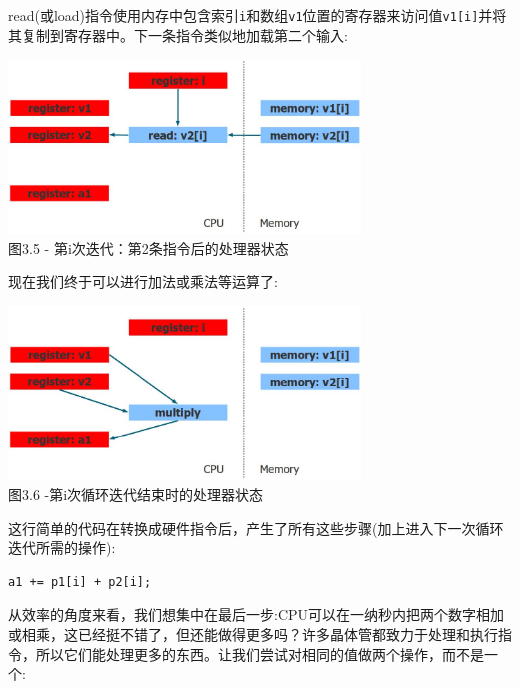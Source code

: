 read(或load)指令使用内存中包含索引\texttt{i}和数组\texttt{v1}位置的寄存器来访问值\texttt{v1[i]}并将其复制到寄存器中。下一条指令类似地加载第二个输入:

\begin{center}
\includegraphics[width=0.7\textwidth]{content/1/chapter3/images/5.jpg}\\
图3.5 - 第i次迭代：第2条指令后的处理器状态
\end{center}

现在我们终于可以进行加法或乘法等运算了:

\begin{center}
\includegraphics[width=0.7\textwidth]{content/1/chapter3/images/6.jpg}\\
图3.6 -第i次循环迭代结束时的处理器状态
\end{center}

这行简单的代码在转换成硬件指令后，产生了所有这些步骤(加上进入下一次循环迭代所需的操作):

\begin{lstlisting}[style=styleCXX]
a1 += p1[i] + p2[i];
\end{lstlisting}

从效率的角度来看，我们想集中在最后一步:CPU可以在一纳秒内把两个数字相加或相乘，这已经挺不错了，但还能做得更多吗？许多晶体管都致力于处理和执行指令，所以它们能处理更多的东西。让我们尝试对相同的值做两个操作，而不是一个:

